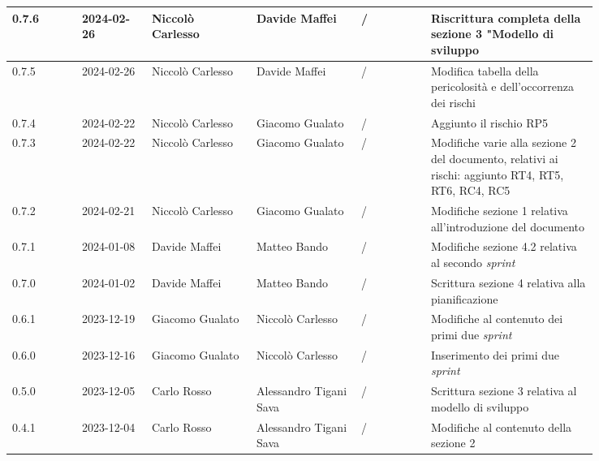 {\begin{longtable}{p{0.10\linewidth}p{0.10\linewidth}p{0.15\linewidth}p{0.15\linewidth}p{0.10\linewidth}p{0.24\linewidth}}
	  \hline
	  0.7.6             & 2024-02-26    & Niccolò Carlesso       & Davide Maffei          & /                    & Riscrittura completa della sezione 3 "Modello di sviluppo                \\
	  \hline
	  0.7.5             & 2024-02-26    & Niccolò Carlesso       & Davide Maffei          & /                    & Modifica tabella della pericolosità e dell’occorrenza dei rischi         \\
	  \hline
	  0.7.4             & 2024-02-22    & Niccolò Carlesso       & Giacomo Gualato        & /                    & Aggiunto il rischio RP5                                                  \\
	  \hline
	  0.7.3             & 2024-02-22    & Niccolò Carlesso       & Giacomo Gualato        & /                    & Modifiche varie alla sezione 2 del documento, relativi ai rischi:
	  aggiunto RT4, RT5, RT6, RC4, RC5                                                                                                                                                      \\
	  \hline
	  0.7.2             & 2024-02-21    & Niccolò Carlesso       & Giacomo Gualato        & /                    & Modifiche sezione 1 relativa all'introduzione del documento              \\
	  \hline
	  0.7.1             & 2024-01-08    & Davide Maffei          & Matteo Bando           & /                    & Modifiche sezione 4.2 relativa al secondo \textit{sprint}                \\
	  \hline
	  0.7.0             & 2024-01-02    & Davide Maffei          & Matteo Bando           & /                    & Scrittura sezione 4 relativa alla pianificazione                         \\
	  \hline
	  0.6.1             & 2023-12-19    & Giacomo Gualato        & Niccolò Carlesso       & /                    & Modifiche al contenuto dei primi due \textit{sprint}                     \\
	  \hline
	  0.6.0             & 2023-12-16    & Giacomo Gualato        & Niccolò Carlesso       & /                    & Inserimento dei primi due \textit{sprint}                                \\
	  \hline
	  0.5.0             & 2023-12-05    & Carlo Rosso            & Alessandro Tigani Sava & /                    & Scrittura sezione 3 relativa al modello di sviluppo                      \\
	  \hline
	  0.4.1             & 2023-12-04    & Carlo Rosso            & Alessandro Tigani Sava & /                    & Modifiche al contenuto della sezione 2                                   \\

\end{longtable}}
